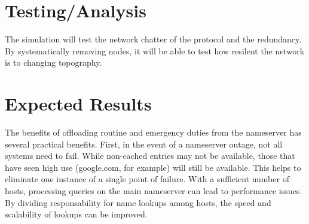 \documentclass[12pt,letterpaper]{article}
\begin{document}
\section{Testing/Analysis}
The simulation will test the network chatter of the protocol and the redundancy. By systematically removing nodes, it will be able to test how resilent the network is to changing topography.
\section{Expected Results}
The benefits of offloading routine and emergency duties from the nameserver has several practical benefits. First, in the event of a nameserver outage, not all systems need to fail. While non-cached entries may not be available, those that have seen high use (google.com, for example) will still be available. This helps to eliminate one instance of a single point of failure. With a sufficient number of hosts, processing queries on the main nameserver can lead to performance issues. By dividing responsability for name lookups among hosts, the speed and scalability of lookups can be improved.
\end{document}
